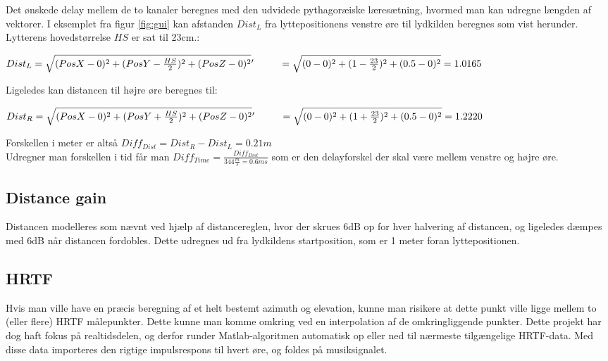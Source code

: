 Det ønskede delay mellem de to kanaler beregnes med den udvidede pythagoræiske læresætning, hvormed man kan udregne længden af vektorer. I eksemplet fra figur \ref{fig:gui} kan afstanden $Dist_L$ fra lyttepositionens venstre øre til lydkilden beregnes som vist herunder. Lytterens hovedstørrelse $HS$ er sat til 23cm.:

\( Dist_L = \sqrt{(PosX-0)^2+(PosY-\frac{HS}{2})^2+(PosZ-0)^2}\\
 '\hspace{.9cm} = \sqrt{(0-0)^2+(1-\frac{23}{2})^2+(0.5-0)^2} = 1.0165 \)
 
 Ligeledes kan distancen til højre øre beregnes til:
 
 \( Dist_R = \sqrt{(PosX-0)^2+(PosY+\frac{HS}{2})^2+(PosZ-0)^2}\\
'\hspace{.9cm} = \sqrt{(0-0)^2+(1+\frac{23}{2})^2+(0.5-0)^2} = 1.2220 \)

Forskellen i meter er altså \( Diff_{Dist} = Dist_R - Dist_L = 0.21m \) \\
Udregner man forskellen i tid får man \( Diff_{Time} = \frac{Diff_{Dist}}{344\frac{m}{s} = 0.6ms}   \) som er den delayforskel der skal være mellem venstre og højre øre.

\subsection{Distance gain}

Distancen modelleres som nævnt ved hjælp af distancereglen, hvor der skrues 6dB op for hver halvering af distancen, og ligeledes dæmpes med 6dB når distancen fordobles. Dette udregnes ud fra lydkildens startposition, som er 1 meter foran lyttepositionen.

\subsection{HRTF}

Hvis man ville have en præcis beregning af et helt bestemt azimuth og elevation, kunne man risikere at dette punkt ville ligge mellem to (eller flere) HRTF målepunkter. Dette kunne man komme omkring ved en interpolation af de omkringliggende punkter. Dette projekt har dog haft fokus på realtidsdelen, og derfor runder Matlab-algoritmen automatisk op eller ned til nærmeste tilgængelige HRTF-data. Med disse data importeres den rigtige impulsrespons til hvert øre, og foldes på musiksignalet.